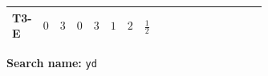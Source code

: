\documentclass[8pt]{article}
\begin{document}
\begin{landscape}
\begin{longtable}{@{}llcccccc >{\raggedright\arraybackslash}p{0.21\linewidth} >{\raggedright\arraybackslash}p{0.21\linewidth} >{\raggedright\arraybackslash}p{0.21\linewidth}@{}}
\midrule
T3-E & $0$ & $3$ & $0$ & $3$ & $1$ & $2$ & $\frac{1}{2}$ & \scriptsize\adjustbox{max width=\linewidth}{$\begin{gathered} \operatorname{Tr}\!\left({Y_e}\,\left({Y_e}\right)^{\dagger}\right) \left({Y_d}\right)_{ij}\end{gathered}$} & \scriptsize\adjustbox{max width=\linewidth}{$\begin{gathered} +3 \operatorname{Tr}\!\left({Y_u}\,\left({Y_u}\right)^{\dagger}\right) \left({Y_d}\right)_{ij}\end{gathered}$} & \scriptsize\adjustbox{max width=\linewidth}{$\begin{gathered} +3 \operatorname{Tr}\!\left({Y_d}\,\left({Y_d}\right)^{\dagger}\right) \left({Y_d}\right)_{ij}\end{gathered}$} \\
\midrule
\bottomrule
\end{longtable}
\clearpage
\noindent\textbf{Search name: }\texttt{yd}\par\smallskip

\end{landscape}
\end{document}
